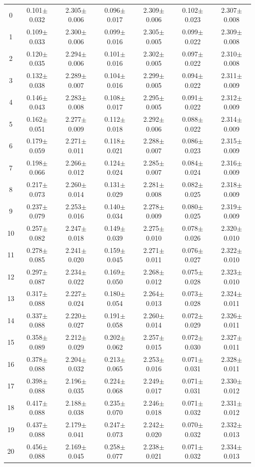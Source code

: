 \begin{table}[H]
{\begin{tabular}{c cc cc cc}
0 & 0.101$\pm$0.032 & 2.305$\pm$0.006 & 0.096$\pm$0.017 & 2.309$\pm$0.006 & 0.102$\pm$0.023 & 2.307$\pm$0.008 \\
1 & 0.109$\pm$0.033 & 2.300$\pm$0.006 & 0.099$\pm$0.016 & 2.305$\pm$0.005 & 0.099$\pm$0.022 & 2.309$\pm$0.008 \\
2 & 0.120$\pm$0.035 & 2.294$\pm$0.006 & 0.101$\pm$0.016 & 2.302$\pm$0.005 & 0.097$\pm$0.022 & 2.310$\pm$0.008 \\
3 & 0.132$\pm$0.038 & 2.289$\pm$0.007 & 0.104$\pm$0.016 & 2.299$\pm$0.005 & 0.094$\pm$0.022 & 2.311$\pm$0.009 \\
4 & 0.146$\pm$0.043 & 2.283$\pm$0.008 & 0.108$\pm$0.017 & 2.295$\pm$0.005 & 0.091$\pm$0.022 & 2.312$\pm$0.009 \\
5 & 0.162$\pm$0.051 & 2.277$\pm$0.009 & 0.112$\pm$0.018 & 2.292$\pm$0.006 & 0.088$\pm$0.022 & 2.314$\pm$0.009 \\
6 & 0.179$\pm$0.059 & 2.271$\pm$0.011 & 0.118$\pm$0.021 & 2.288$\pm$0.007 & 0.086$\pm$0.023 & 2.315$\pm$0.009 \\
7 & 0.198$\pm$0.066 & 2.266$\pm$0.012 & 0.124$\pm$0.024 & 2.285$\pm$0.007 & 0.084$\pm$0.024 & 2.316$\pm$0.009 \\
8 & 0.217$\pm$0.073 & 2.260$\pm$0.014 & 0.131$\pm$0.029 & 2.281$\pm$0.008 & 0.082$\pm$0.025 & 2.318$\pm$0.009 \\
9 & 0.237$\pm$0.079 & 2.253$\pm$0.016 & 0.140$\pm$0.034 & 2.278$\pm$0.009 & 0.080$\pm$0.025 & 2.319$\pm$0.009 \\
10 & 0.257$\pm$0.082 & 2.247$\pm$0.018 & 0.149$\pm$0.039 & 2.275$\pm$0.010 & 0.078$\pm$0.026 & 2.320$\pm$0.010 \\
11 & 0.278$\pm$0.085 & 2.241$\pm$0.020 & 0.159$\pm$0.045 & 2.271$\pm$0.011 & 0.076$\pm$0.027 & 2.322$\pm$0.010 \\
12 & 0.297$\pm$0.087 & 2.234$\pm$0.022 & 0.169$\pm$0.050 & 2.268$\pm$0.012 & 0.075$\pm$0.028 & 2.323$\pm$0.010 \\
13 & 0.317$\pm$0.088 & 2.227$\pm$0.024 & 0.180$\pm$0.054 & 2.264$\pm$0.013 & 0.073$\pm$0.028 & 2.324$\pm$0.011 \\
14 & 0.337$\pm$0.088 & 2.220$\pm$0.027 & 0.191$\pm$0.058 & 2.260$\pm$0.014 & 0.072$\pm$0.029 & 2.326$\pm$0.011 \\
15 & 0.358$\pm$0.089 & 2.212$\pm$0.029 & 0.202$\pm$0.062 & 2.257$\pm$0.015 & 0.072$\pm$0.030 & 2.327$\pm$0.011 \\
16 & 0.378$\pm$0.088 & 2.204$\pm$0.032 & 0.213$\pm$0.065 & 2.253$\pm$0.016 & 0.071$\pm$0.031 & 2.328$\pm$0.011 \\
17 & 0.398$\pm$0.088 & 2.196$\pm$0.035 & 0.224$\pm$0.068 & 2.249$\pm$0.017 & 0.071$\pm$0.031 & 2.330$\pm$0.012 \\
18 & 0.417$\pm$0.088 & 2.188$\pm$0.038 & 0.235$\pm$0.070 & 2.246$\pm$0.018 & 0.071$\pm$0.032 & 2.331$\pm$0.012 \\
19 & 0.437$\pm$0.088 & 2.179$\pm$0.041 & 0.247$\pm$0.073 & 2.242$\pm$0.020 & 0.070$\pm$0.032 & 2.332$\pm$0.013 \\
20 & 0.456$\pm$0.088 & 2.169$\pm$0.045 & 0.258$\pm$0.077 & 2.238$\pm$0.021 & 0.071$\pm$0.032 & 2.334$\pm$0.013 \\


\end{tabular}}
\end{table}
